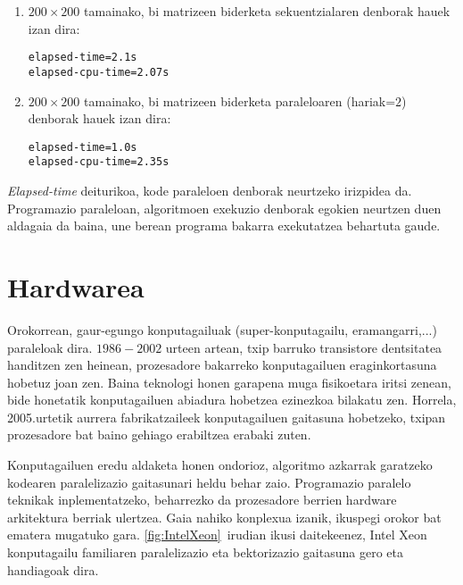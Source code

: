 \begin{enumerate}
\item $200 \times 200$ tamainako, bi matrizeen biderketa sekuentzialaren denborak hauek izan dira:
\begin{lstlisting}
elapsed-time=2.1s
elapsed-cpu-time=2.07s
\end{lstlisting}

\item $200 \times 200$ tamainako, bi matrizeen biderketa paraleloaren (hariak=$2$) denborak hauek izan dira:
\begin{lstlisting}
elapsed-time=1.0s
elapsed-cpu-time=2.35s
\end{lstlisting}
 
 
\end{enumerate}
 
\emph{Elapsed-time} deiturikoa, kode paraleloen denborak neurtzeko irizpidea da. Programazio paraleloan, algoritmoen exekuzio denborak egokien neurtzen duen aldagaia da baina, une berean programa bakarra exekutatzea behartuta gaude.       


\section{Hardwarea}


Orokorrean, gaur-egungo konputagailuak (super-konputagailu, eramangarri,...) paraleloak dira. $1986-2002$ urteen artean, txip barruko transistore dentsitatea handitzen zen heinean, prozesadore bakarreko konputagailuen eraginkortasuna hobetuz joan zen. Baina teknologi honen garapena muga fisikoetara iritsi zenean, bide honetatik konputagailuen abiadura hobetzea ezinezkoa bilakatu zen. Horrela, 2005.urtetik aurrera fabrikatzaileek konputagailuen gaitasuna hobetzeko, txipan prozesadore bat baino gehiago erabiltzea erabaki zuten.  


Konputagailuen eredu aldaketa honen ondorioz, algoritmo azkarrak garatzeko kodearen paralelizazio gaitasunari heldu behar zaio. Programazio paralelo teknikak inplementatzeko, beharrezko da prozesadore berrien hardware arkitektura berriak ulertzea. Gaia nahiko konplexua izanik, ikuspegi orokor bat ematera mugatuko gara. \ref{fig:IntelXeon}~irudian ikusi daitekeenez, Intel Xeon konputagailu familiaren paralelizazio eta bektorizazio gaitasuna gero eta handiagoak dira.  


